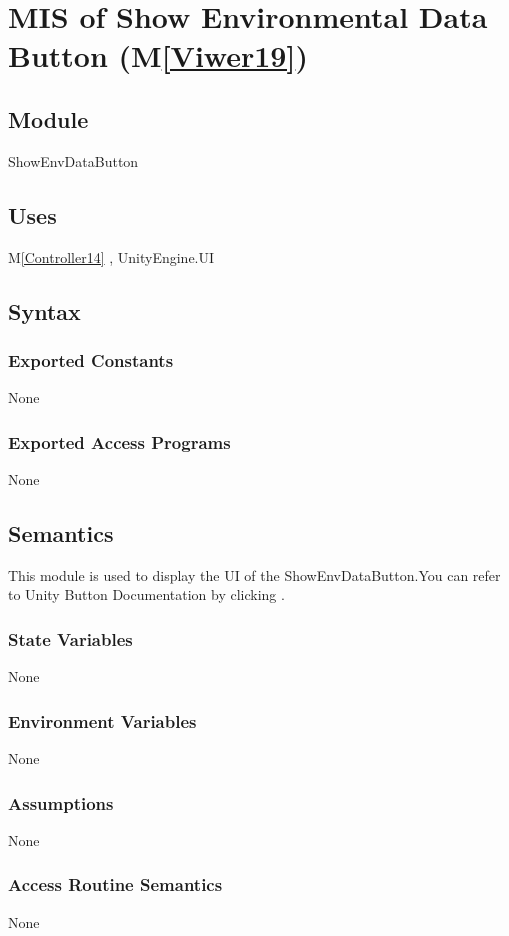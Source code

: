 \documentclass[12pt, titlepage]{article}
\newcommand{\mref}[1]{M\ref{#1}}
\begin{document}
\newpage

\section{MIS of Show Environmental Data Button (\mref{Viwer19})}

\subsection{Module}
ShowEnvDataButton

\subsection{Uses}
\mref{Controller14}  , UnityEngine.UI

\subsection{Syntax}
\subsubsection{Exported Constants}
None
\subsubsection{Exported Access Programs}
None


\subsection{Semantics}
This module is used to display the UI of the 
ShowEnvDataButton.You can refer to Unity Button Documentation by
clicking \bref.
\subsubsection{State Variables}
None
\subsubsection{Environment Variables}
None
\subsubsection{Assumptions}
None
\subsubsection{Access Routine Semantics}
None
\end{document}
